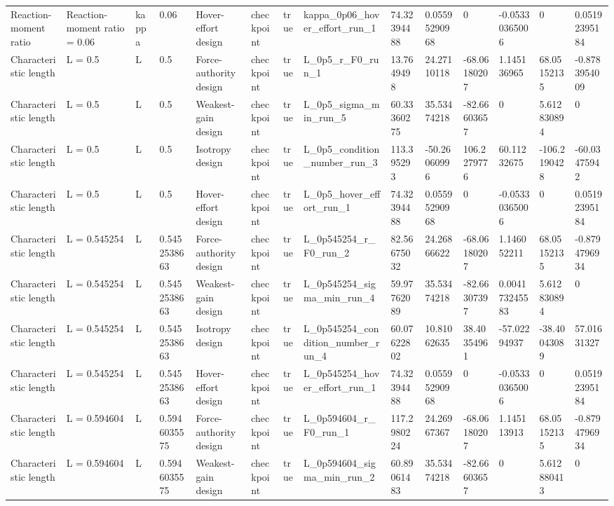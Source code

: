 \begin{tabular}{@{}llllllllllllll@{}}
Reaction-moment ratio & Reaction-moment ratio = 0.06 & kappa & 0.06 & Hover-effort design & checkpoint & true & kappa\_0p06\_hover\_effort\_run\_1 & 74.32394488 & 0.05595290968 & 0 & -0.05330365006 & 0 & 0.05192395184 \\
Characteristic length & L = 0.5 & L & 0.5 & Force-authority design & checkpoint & true & L\_0p5\_r\_F0\_run\_1 & 13.7649498 & 24.27110118 & -68.06180207 & 1.145136965 & 68.05152135 & -0.8783954009 \\
Characteristic length & L = 0.5 & L & 0.5 & Weakest-gain design & checkpoint & true & L\_0p5\_sigma\_min\_run\_5 & 60.33360275 & 35.53474218 & -82.66603657 & 0 & 5.612830894 & 0 \\
Characteristic length & L = 0.5 & L & 0.5 & Isotropy design & checkpoint & true & L\_0p5\_condition\_number\_run\_3 & 113.395293 & -50.26060996 & 106.2279776 & 60.11232675 & -106.2190428 & -60.03475942 \\
Characteristic length & L = 0.5 & L & 0.5 & Hover-effort design & checkpoint & true & L\_0p5\_hover\_effort\_run\_1 & 74.32394488 & 0.05595290968 & 0 & -0.05330365006 & 0 & 0.05192395184 \\
Characteristic length & L = 0.545254 & L & 0.5452538663 & Force-authority design & checkpoint & true & L\_0p545254\_r\_F0\_run\_2 & 82.56675032 & 24.26866622 & -68.06180207 & 1.146052211 & 68.05152135 & -0.8794796934 \\
Characteristic length & L = 0.545254 & L & 0.5452538663 & Weakest-gain design & checkpoint & true & L\_0p545254\_sigma\_min\_run\_4 & 59.97762089 & 35.53474218 & -82.66307397 & 0.004173245583 & 5.612830894 & 0 \\
Characteristic length & L = 0.545254 & L & 0.5452538663 & Isotropy design & checkpoint & true & L\_0p545254\_condition\_number\_run\_4 & 60.07622802 & 10.81062635 & 38.40354961 & -57.02294937 & -38.40043089 & 57.01631327 \\
Characteristic length & L = 0.545254 & L & 0.5452538663 & Hover-effort design & checkpoint & true & L\_0p545254\_hover\_effort\_run\_1 & 74.32394488 & 0.05595290968 & 0 & -0.05330365006 & 0 & 0.05192395184 \\
Characteristic length & L = 0.594604 & L & 0.5946035575 & Force-authority design & checkpoint & true & L\_0p594604\_r\_F0\_run\_1 & 117.2980224 & 24.26967367 & -68.06180207 & 1.145113913 & 68.05152135 & -0.8794796934 \\
Characteristic length & L = 0.594604 & L & 0.5946035575 & Weakest-gain design & checkpoint & true & L\_0p594604\_sigma\_min\_run\_2 & 60.89061483 & 35.53474218 & -82.66603657 & 0 & 5.612880413 & 0 \\

\end{tabular}
